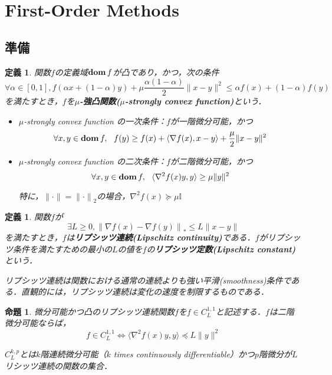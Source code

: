 \documentclass[a4paper,11pt]{jsarticle}
\newtheorem{prop}[theorem]{命題}
\newtheorem{definition}[theorem]{定義}
\numberwithin{theorem}{section}  %
\numberwithin{equation}{section} %
\newcommand{\dom}{\mathop{\mathrm{\bf dom}}\nolimits}
\begin{document}
\section{First-Order Methods}
\subsection{準備}
\begin{definition}
関数$f$の定義域$\dom f$が凸であり，かつ，次の条件
\begin{equation}
\forall \alpha \in [0,1], f(\alpha x + (1- \alpha)y) + \mu \frac{\alpha(1-\alpha)}{2}\|x-y\|^2 \le \alpha f(x) + (1- \alpha)f(y)
\end{equation}
を満たすとき，$f$を{\bf $\mu$-強凸関数($\mu$-strongly convex function)}という．
\begin{itemize}
\item
$\mu$-strongly convex function の一次条件：$f$が一階微分可能，かつ
\begin{equation}
\forall x,y \in \dom f, \,\,\,\, f(y) \ge f(x) + \langle \nabla f(x),x-y \rangle + \frac{\mu}{2} \| x-y \|^2
\end{equation}
\item
$\mu$-strongly convex function の二次条件：$f$が二階微分可能，かつ
\begin{equation}
\forall x,y \in \dom f, \,\,\,\, \langle \nabla^2 f(x)y,y \rangle \ge \mu \| y \|^2
\end{equation}

特に，$\|\cdot\|={\|\cdot\|}_2$の場合，$\nabla^2 f(x) \succeq \mu \mathbb{I}$
\end{itemize}
\end{definition}
\begin{definition}
関数$f$が
\begin{equation}
\exists L \ge 0,{\| \nabla f(x) - \nabla f(y)\|}_{*} \le L \|x-y\|
\end{equation}
を満たすとき，$f$は{\bf リプシッツ連続(Lipschitz continuity)}である．$f$がリプシッツ条件を満たすための最小の$L$の値を$f$の{\bf リプシッツ定数(Lipschitz constant)}という．

リプシッツ連続は関数における通常の連続よりも強い平滑(smoothness)条件である．直観的には，リプシッツ連続は変化の速度を制限するものである．
\end{definition}
\begin{prop}
微分可能かつ凸のリプシッツ連続関数$f$を$f \in C_{L}^{1,1}$と記述する．$f$は二階微分可能ならば，
\begin{equation}
f \in C_{L}^{1,1} \Leftrightarrow \langle \nabla^2 f(x)y,y \rangle \preceq L\|y\|^2
\end{equation}

$C_L^{k,p}$とは$k$階連続微分可能（$k$ times continuously differentiable）かつ$p$階微分が$L$リシッツ連続の関数の集合．
\end{prop}
\end{document}
